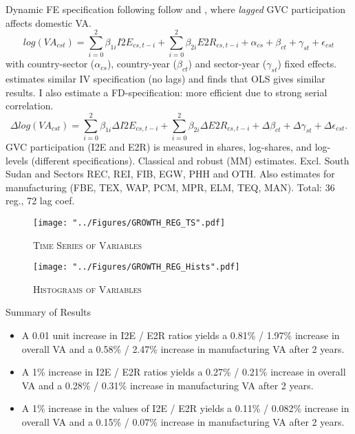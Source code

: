 \documentclass[compress]{beamer}
\begin{document}
\begin{frame}
Dynamic FE specification following follow \citet{kummritz2015global} and \citet{LiLiu2015moving}, where \emph{lagged} GVC participation affects domestic VA.
$$
log(VA_{cst}) = \sum_{i=0}^2 \beta_{1i} I2E_{cs,t-i} + \sum_{i = 0}^2 \beta_{2i} E2R_{cs,t-i}  + \alpha_{cs} + \beta_{ct} +\gamma_{st} + \epsilon_{cst}
$$
with country-sector ($\alpha_{cs}$), country-year ($\beta_{ct}$) and sector-year ($\gamma_{st}$) fixed effects. \citet{Kummritz20161} estimates similar IV specification (no lags) and finds that OLS gives similar results. I also estimate a FD-specification: more efficient due to strong serial correlation.
$$
\Delta log(VA_{cst}) = \sum_{i=0}^2 \beta_{1i} \Delta I2E_{cs,t-i} + \sum_{i = 0}^2 \beta_{2i} \Delta E2R_{cs,t-i}  + \Delta\beta_{ct} + \Delta\gamma_{st} + \Delta\epsilon_{cst}.
$$
GVC participation (I2E and E2R) is measured in shares, log-shares, and log-levels (different specifications). Classical and robust (MM) estimates. Excl. South Sudan and Sectors REC, REI, FIB, EGW, PHH and OTH. Also estimates for manufacturing (FBE, TEX, WAP, PCM, MPR, ELM, TEQ, MAN). Total: 36 reg., 72 lag coef. 
\end{frame}

\begin{frame}
\begin{figure}[h!]
\centering
\caption{\label{fig:GROWTH_REG_TS}\textsc{Time Series of Variables}}
\begin{adjustbox}{center}
\texttt{[image: "../Figures/GROWTH\_REG\_TS".pdf]} %
\end{adjustbox}
\end{figure}
\end{frame}

\begin{frame}
\begin{figure}[h!]
\centering
\caption{\label{fig:GROWTH_REG_Hists}\textsc{Histograms of Variables}}
\begin{adjustbox}{center}
\texttt{[image: "../Figures/GROWTH\_REG\_Hists".pdf]} %
\end{adjustbox}
\end{figure}
\end{frame}

\begin{frame}{Summary of Results}
\begin{itemize}
\item A 0.01 unit increase in I2E / E2R ratios yields a 0.81\% / 1.97\% increase in overall VA and a 0.58\% / 2.47\% increase in manufacturing VA after 2 years.
\item A 1\% increase in I2E / E2R ratios yields a 0.27\% / 0.21\% increase in overall VA and a 0.28\% / 0.31\% increase in manufacturing VA after 2 years.
\item A 1\% increase in the values of I2E / E2R yields a 0.11\% / 0.082\% increase in overall VA and a 0.15\% / 0.07\% increase in manufacturing VA after 2 years.
\end{itemize}
\end{frame}
\end{document}

